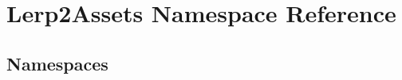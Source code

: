 \hypertarget{namespace_lerp2_assets}{}\section{Lerp2\+Assets Namespace Reference}
\label{namespace_lerp2_assets}
\subsection*{Namespaces}
\begin{DoxyCompactItemize}
\end{DoxyCompactItemize}
